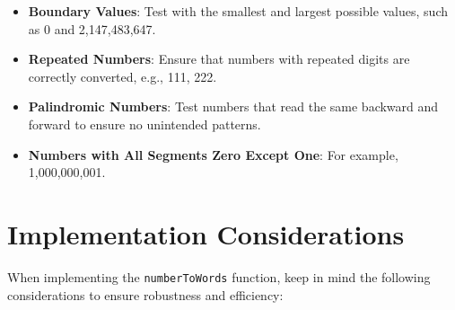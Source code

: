 \begin{itemize}
    \item \textbf{Boundary Values}: Test with the smallest and largest possible values, such as 0 and 2,147,483,647.
    
    \item \textbf{Repeated Numbers}: Ensure that numbers with repeated digits are correctly converted, e.g., 111, 222.
    
    \item \textbf{Palindromic Numbers}: Test numbers that read the same backward and forward to ensure no unintended patterns.
    
    \item \textbf{Numbers with All Segments Zero Except One}: For example, 1,000,000,001.
\end{itemize}

\section*{Implementation Considerations}

When implementing the \texttt{numberToWords} function, keep in mind the following considerations to ensure robustness and efficiency:

